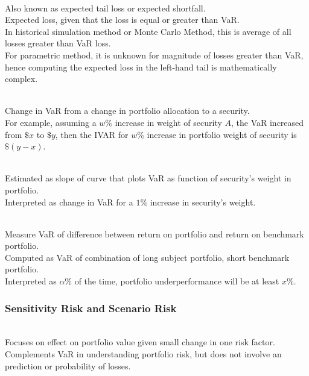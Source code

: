 \begin{definition} \\
Also known as expected tail loss or expected shortfall.\\
Expected loss, given that the loss is equal or greater than VaR.\\
In historical simulation method or Monte Carlo Method, this is average of all losses greater than VaR loss.\\
For parametric method, it is unknown for magnitude of losses greater than VaR, hence computing the expected loss in the left-hand tail is mathematically complex.
\end{definition}

\begin{definition} \\
Change in VaR from a change in portfolio allocation to a security.\\
For example, assuming a $w \%$ increase in weight of security $A$, the VaR increased from $\$x$ to $\$y$, then the IVAR for $w \%$ increase in portfolio weight of security is $\$ (y - x)$.
\end{definition}

\begin{definition} \\
Estimated as slope of curve that plots VaR as function of security's weight in portfolio.\\
Interpreted as change in VaR for a $1\%$ increase in security's weight.
\end{definition}

\begin{definition} \\
Measure VaR of difference between return on portfolio and return on benchmark portfolio.\\
Computed as VaR of combination of long subject portfolio, short benchmark portfolio.\\
Interpreted as $\alpha \%$ of the time, portfolio underperformance will be at least $x \%$. 
\end{definition}

\subsubsection{Sensitivity Risk and Scenario Risk}

\begin{remark} \\
Focuses on effect on portfolio value given small change in one risk factor.\\
Complements VaR in understanding portfolio risk, but does not involve an prediction or probability of losses.
\end{remark}

